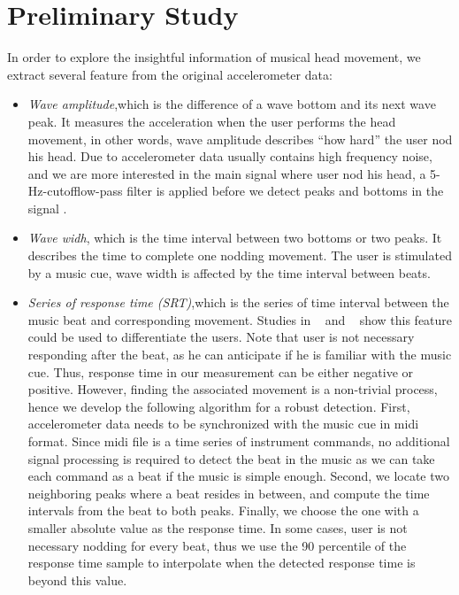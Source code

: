 \section{Preliminary Study}
In order to explore the insightful information of musical head movement, we extract several feature from the original accelerometer data:
\begin{itemize}
\item{\em Wave amplitude},which is the difference of a wave bottom and its next wave peak. It measures the acceleration when the user performs the head movement, in other words, wave amplitude describes “how hard” the user nod his head. Due to accelerometer data usually contains high frequency noise, and we are more interested in the main signal where user nod his head, a 5-Hz-cutofflow-pass filter is applied before we detect peaks and bottoms in the signal .   
\item{\em Wave widh}, which is the time interval between two bottoms or two peaks. It describes the time to complete one nodding movement. The user is stimulated by a music cue, wave width is affected by the time interval between beats.
\item{\em Series of response time (SRT)},which is the series of time interval between the music beat and corresponding movement. Studies in ~\cite{eye blink} and ~\cite{tap beat} show this feature could be used to differentiate the users. Note that user is not necessary responding after the beat, as he can anticipate if he is familiar with the music cue. Thus, response time in our measurement can be either negative or positive. However, finding the associated movement is a non-trivial process, hence we develop the following algorithm for a robust detection. First, accelerometer data needs to be synchronized with the music cue in midi format. Since midi file is a time series of instrument commands,  no additional signal processing is required to detect the beat in the music as we can take each command as a beat if the music is simple enough. Second, we locate two neighboring peaks where a beat resides in between, and compute the time intervals from the beat to both peaks. Finally, we choose the one with a smaller absolute value as the response time. In some cases,  user is not necessary nodding for every beat,  thus we use the 90 percentile of the response time sample to interpolate  when the detected response time is beyond this value. 
\end{itemize}
